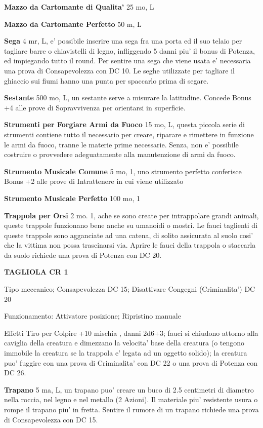 \documentclass[a4paper,11pt,twoside,openany]{book}
\begin{document}
{\textbf{Mazzo da Cartomante di Qualita'} 25 mo, L

\textbf{Mazzo da Cartomante Perfetto} 50 m, L

\textbf{Sega} 4 mr, L, e' possibile inserire una sega fra una porta ed il suo telaio per tagliare barre o chiavistelli di legno, infliggendo 5 danni piu' il bonus di Potenza, ed impiegando tutto il round. 
Per sentire una sega che viene usata e' necessaria una prova di Consapevolezza con DC 10. Le seghe utilizzate per tagliare il ghiaccio sui fiumi hanno una punta per spaccarlo prima di segare.

\textbf{Sestante} 500 mo, L, un sestante serve a misurare la latitudine. Concede Bonus +4 alle prove di Sopravvivenza per orientarsi in superficie.

\textbf{Strumenti per Forgiare Armi da Fuoco} 15 mo, L, questa piccola serie di strumenti contiene tutto il necessario per creare, riparare e rimettere in funzione le armi da fuoco, tranne le materie prime necessarie. Senza, non e' possibile costruire o provvedere adeguatamente alla manutenzione di armi da fuoco.

\textbf{Strumento Musicale Comune} 5 mo, 1, uno strumento perfetto conferisce Bonus +2 alle prove di Intrattenere in cui viene utilizzato

\textbf{Strumento Musicale Perfetto} 100 mo, 1

\textbf{Trappola per Orsi} 2 mo. 1, ache se sono create per intrappolare grandi animali, queste trappole funzionano bene anche su umanoidi o mostri. Le fauci taglienti di queste trappole sono agganciate ad una catena, di solito assicurata al suolo cosi' che la vittima non possa trascinarsi via. Aprire le fauci della trappola o staccarla da suolo richiede una prova di Potenza con DC 20.

\textbf{TAGLIOLA CR 1}

Tipo meccanico; Consapevolezza DC 15; Disattivare Congegni (Criminalita') DC 20

Funzionamento:  Attivatore posizione; Ripristino manuale

Effetti Tiro per Colpire +10 mischia , danni 2d6+3; fauci si chiudono attorno alla caviglia della creatura e dimezzano la velocita' base della creatura (o tengono immobile la creatura se la trappola e' legata ad un oggetto solido); la creatura puo' fuggire con una prova di Criminalita' con DC 22 o una prova di Potenza con DC 26.

\textbf{Trapano} 5 ma, L, un trapano puo' creare un buco di 2.5 centimetri di diametro nella roccia, nel legno e nel metallo (2 Azioni). Il materiale piu' resistente usura o rompe il trapano piu' in fretta. Sentire il rumore di un trapano richiede una prova di Consapevolezza con DC 15.

}
\end{document}
